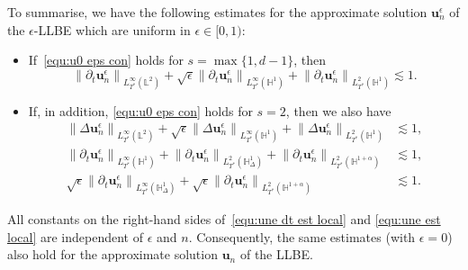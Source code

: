 \documentclass[11pt,reqno]{amsart}
\theoremstyle{definition}
\numberwithin{equation}{section}
\newcommand{\bff}{\boldsymbol}
\newcommand{\bb}{\mathbb}
\newcommand{\pa}{\partial}
\newcommand{\norm}[2]{\left\|{#1}\right\|_{#2}}
\begin{document}
To summarise, we have the following estimates for the approximate solution $\bff{u}_n^\epsilon$ of the $\epsilon$-LLBE which are uniform in $\epsilon\in [0,1)$:
\begin{itemize}
	\item 
	If~\eqref{equ:u0 eps con} holds for $s=\max\{1,d-1\}$, then
	\begin{equation}\label{equ:une dt est local}
		\norm{\pa_t\bff{u}_n^\epsilon}{L^\infty_{T^\ast}(\bb{L}^2)}
		+
        \sqrt{\epsilon} \norm{\partial_t \bff{u}_n^\epsilon}{L^\infty_{T^\ast}(\bb{H}^1)}
        +
		\norm{\pa_t\bff{u}_n^\epsilon}{L^2_{T^\ast}(\bb{H}^1)}
		\lesssim 1.
	\end{equation}
	\item 
	If, in addition, \eqref{equ:u0 eps con} holds for $s=2$, then we also have
    \begin{equation}\label{equ:une est local}
	\begin{aligned}
		\norm{\Delta \bff{u}_n^\epsilon}{L^\infty_{T^\ast}(\bb{L}^2)}
        +
        \sqrt{\epsilon} \norm{\Delta \bff{u}_n^\epsilon}{L^\infty_{T^\ast}(\bb{H}^1)}
		+
		\norm{\Delta \bff{u}_n^\epsilon}{L^2_{T^\ast}(\bb{H}^1)}
		&\lesssim 1,
		\\
		\norm{\pa_t\bff{u}_n^\epsilon}{L^\infty_{T^\ast}(\bb{H}^1)}
		+
		\norm{\pa_t\bff{u}_n^\epsilon}{L^2_{T^\ast}(\bb{H}^1_\Delta)}
		+
		\norm{\pa_t\bff{u}_n^\epsilon}{L^2_{T^\ast}(\bb{H}^{1+\alpha})}
        &\lesssim 1,
        \\
        \sqrt{\epsilon} \norm{\pa_t\bff{u}_n^\epsilon}{L^\infty_{T^\ast}(\bb{H}^1_\Delta)}
        +
        \sqrt{\epsilon} \norm{\pa_t \bff{u}_n^\epsilon}{L^2_{T^\ast}(\bb{H}^{1+\alpha})}
		&\lesssim 1.
	\end{aligned}
\end{equation}
\end{itemize}
All constants on the right-hand sides of~\eqref{equ:une dt est local} and \eqref{equ:une est local} are independent of $\epsilon$ and $n$. Consequently, the same estimates (with $\epsilon=0$) also hold for the approximate solution $\bff{u}_n$ of the LLBE.


%
%
\end{document}
